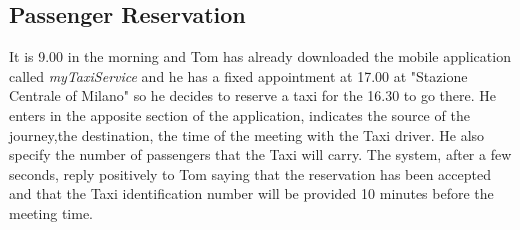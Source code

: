 \subsection{Passenger Reservation}
It is 9.00 in the morning and Tom has already downloaded the mobile application called \textit{myTaxiService} and he has a fixed appointment at 17.00 at "Stazione Centrale of Milano" so he decides to reserve a taxi for the 16.30 to go there. He enters in the apposite section of the application, indicates the source of the journey,the destination, the time of the meeting with the Taxi driver. He also specify the number of passengers that the Taxi will carry. The system, after a few seconds, reply positively to Tom saying that the reservation has been accepted and that the Taxi identification number will be provided 10 minutes before the meeting time.

